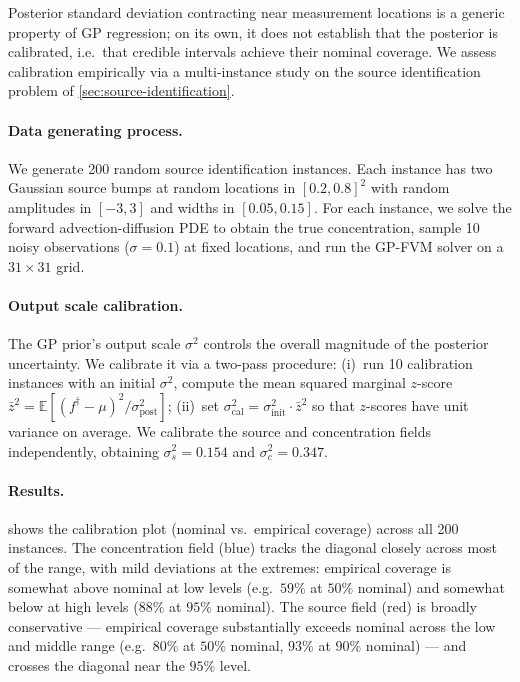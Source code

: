 \documentclass{article}
\theoremstyle{plain}
\theoremstyle{definition}
\theoremstyle{remark}
\begin{document}
Posterior standard deviation contracting near measurement locations is a generic property of GP regression; on its own, it does not establish that the posterior is calibrated, i.e.\ that credible intervals achieve their nominal coverage.  We assess calibration empirically via a multi-instance study on the source identification problem of \cref{sec:source-identification}.

\paragraph{Data generating process.}
We generate 200 random source identification instances.  Each instance has two Gaussian source bumps at random locations in $[0.2, 0.8]^2$ with random amplitudes in $[-3, 3]$ and widths in $[0.05, 0.15]$.  For each instance, we solve the forward advection-diffusion PDE to obtain the true concentration, sample 10 noisy observations ($\sigma = 0.1$) at fixed locations, and run the GP-FVM solver on a $31 \times 31$ grid.

\paragraph{Output scale calibration.}
The GP prior's output scale $\sigma^2$ controls the overall magnitude of the posterior uncertainty.  We calibrate it via a two-pass procedure: (i)~run 10 calibration instances with an initial $\sigma^2$, compute the mean squared marginal $z$-score $\bar{z}^2 = \mathbb{E}[(f^\dagger - \mu)^2 / \sigma_\text{post}^2]$; (ii)~set $\sigma^2_\text{cal} = \sigma^2_\text{init} \cdot \bar{z}^2$ so that $z$-scores have unit variance on average.  We calibrate the source and concentration fields independently, obtaining $\sigma^2_s = 0.154$ and $\sigma^2_c = 0.347$.

\paragraph{Results.}
 shows the calibration plot (nominal vs.\ empirical coverage) across all 200 instances.  The concentration field (blue) tracks the diagonal closely across most of the range, with mild deviations at the extremes: empirical coverage is somewhat above nominal at low levels (e.g.\ $59\%$ at $50\%$ nominal) and somewhat below at high levels ($88\%$ at $95\%$ nominal).  The source field (red) is broadly conservative --- empirical coverage substantially exceeds nominal across the low and middle range (e.g.\ $80\%$ at $50\%$ nominal, $93\%$ at $90\%$ nominal) --- and crosses the diagonal near the $95\%$ level.
\end{document}
